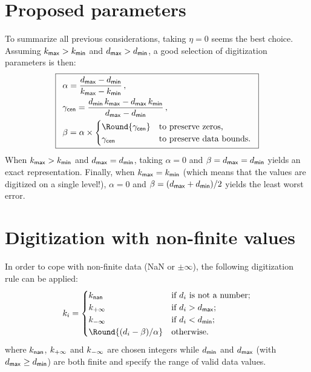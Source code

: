 \documentclass[]{article}
\begin{document}
\section{Proposed parameters}

To summarize all previous considerations, taking $\eta = 0$ seems the best
choice. Assuming $k_{\mathsf{max}} > k_{\mathsf{min}}$ and $d_{\mathsf{max}} > d_{\mathsf{min}}$, a
good selection of digitization parameters is then:
\begin{equation}
  \boxed{
  \begin{array}{l}
    \displaystyle
    \alpha = \frac{d_\Tag{max} - d_\Tag{min}}
                  {k_\Tag{max} - k_\Tag{min}} \, , \\[2ex]
    \displaystyle
    \gamma_\Tag{cen} = \frac{d_\Tag{min}\,k_\Tag{max} - d_\Tag{max}\,k_\Tag{min}}
                            {d_\Tag{max} - d_\Tag{min}} \, , \\[2ex]
    \displaystyle
    \beta = \alpha\times\begin{cases}
    \Round{\gamma_\Tag{cen}} & \text{to preserve zeros,} \\
    \gamma_\Tag{cen} & \text{to preserve data bounds.} \\
    \end{cases}
  \end{array}
  }
\end{equation}
When $k_{\mathsf{max}} > k_{\mathsf{min}}$ and $d_{\mathsf{max}} = d_{\mathsf{min}}$, taking
$\alpha = 0$ and $\beta = d_{\mathsf{max}} = d_{\mathsf{min}}$ yields an exact
representation.  Finally, when $k_{\mathsf{max}} = k_{\mathsf{min}}$ (which means that
the values are digitized on a single level!), $\alpha = 0$ and $\beta =
(d_{\mathsf{max}} + d_{\mathsf{min}})/2$ yields the least worst error.


\section{Digitization with non-finite values}

In order to cope with non-finite data (NaN or $\pm\infty$), the following
digitization rule can be applied:
\begin{equation}
  \label{eq:complex-digitization}
  k_i = \begin{cases}
     k_\Tag{nan}     & \text{if $d_i$ is not a number;}\\
     k_\Tag{+\infty} & \text{if $d_i > d_\Tag{max}$;}\\
     k_\Tag{-\infty} & \text{if $d_i < d_\Tag{min}$;}\\
     \Round{(d_i - \beta)/\alpha} & \text{otherwise.}
  \end{cases}
\end{equation}
where $k_{\mathsf{nan}}$, $k_{\mathsf{+\infty}}$ and $k_{\mathsf{-\infty}}$ are chosen
integers while $d_{\mathsf{min}}$ and $d_{\mathsf{max}}$ (with $d_{\mathsf{max}} \ge
d_{\mathsf{min}}$) are both finite and specify the range of valid data values. 
\end{document}
